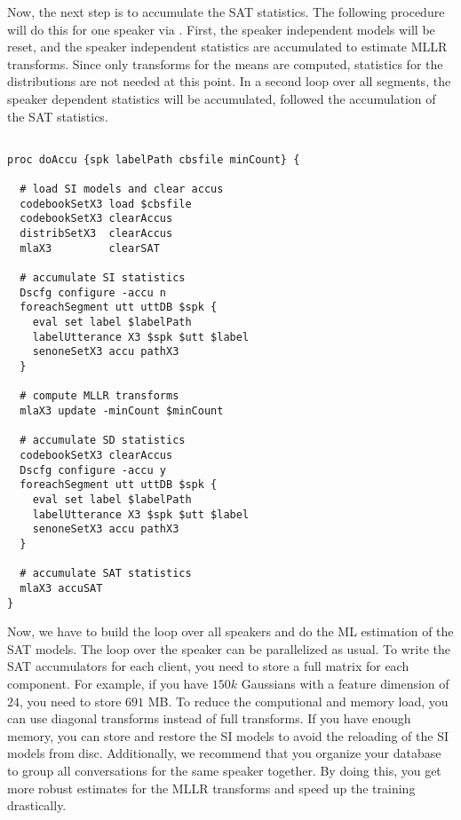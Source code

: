 Now, the next step is to accumulate  the SAT statistics. The following
procedure   will     do       this   for      one    speaker       via
.  First,  the speaker  independent  models
will be reset, and the  speaker independent statistics are accumulated
to estimate MLLR transforms.  Since  only transforms for the means are
computed,  statistics  for the  distributions are   not needed at this
point. In  a second  loop  over  all  segments, the speaker  dependent
statistics  will be accumulated,  followed the accumulation of the SAT
statistics.

\begin{verbatim}

proc doAccu {spk labelPath cbsfile minCount} {

  # load SI models and clear accus
  codebookSetX3 load $cbsfile
  codebookSetX3 clearAccus
  distribSetX3  clearAccus
  mlaX3         clearSAT

  # accumulate SI statistics
  Dscfg configure -accu n
  foreachSegment utt uttDB $spk {
    eval set label $labelPath
    labelUtterance X3 $spk $utt $label
    senoneSetX3 accu pathX3
  }

  # compute MLLR transforms
  mlaX3 update -minCount $minCount

  # accumulate SD statistics
  codebookSetX3 clearAccus
  Dscfg configure -accu y
  foreachSegment utt uttDB $spk {
    eval set label $labelPath
    labelUtterance X3 $spk $utt $label
    senoneSetX3 accu pathX3
  }

  # accumulate SAT statistics
  mlaX3 accuSAT 
}

\end{verbatim}

Now, we  have  to build  the loop   over all speakers   and do  the ML
estimation of  the  SAT models.   The  loop over  the speaker  can  be
parallelized as usual.  To write the SAT accumulators for each client,
you need  to store a full matrix  for each component. For  example, if
you have  $150k$ Gaussians with a  feature dimension of $24$, you need
to store $691$ MB. To reduce the computional  and memory load, you can
use diagonal transforms instead of full transforms. If you have enough
memory, you can store and restore the SI models to avoid the reloading
of the  SI  models from   disc.  Additionally, we recommend that   you
organize your database to group all conversations for the same speaker
together. By doing  this, you get  more robust estimates for  the MLLR
transforms and speed up the training drastically.

